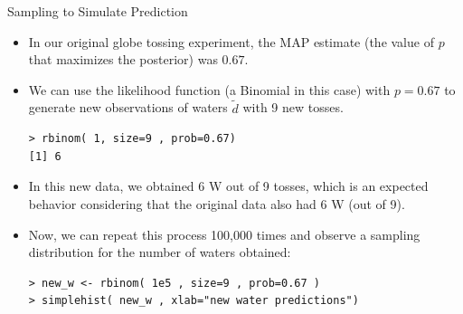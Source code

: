 \documentclass[handout]{beamer}
\begin{document}
\begin{frame}[fragile]{Sampling to Simulate Prediction}
\scriptsize{

\begin{itemize}
\item In our original globe tossing experiment, the MAP estimate (the value of $p$ that maximizes the posterior) was $0.67$.

\item We can use the likelihood function (a Binomial in this case) with $p=0.67$ to generate new observations of waters  $\tilde{d}$ with 9 new tosses.

\begin{verbatim}
> rbinom( 1, size=9 , prob=0.67)
[1] 6 
\end{verbatim}

\item In this new data, we obtained 6 W out of 9 tosses, which is an expected behavior considering that the original data also had 6 W (out of 9).

\item Now, we can repeat this process 100,000 times and observe a sampling distribution for the number of waters obtained:

\begin{verbatim}
> new_w <- rbinom( 1e5 , size=9 , prob=0.67 )
> simplehist( new_w , xlab="new water predictions") 
\end{verbatim}




\end{itemize}


} 
\end{frame}
\end{document}
